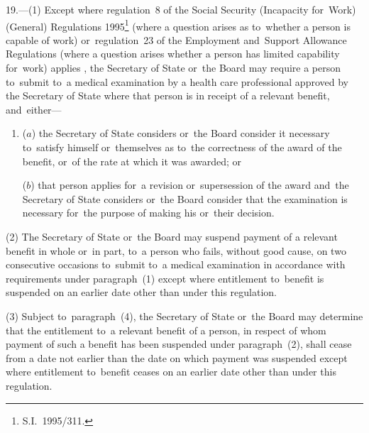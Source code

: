 \documentclass[12pt,a4paper]{article}
\begin{document}
19.—(1) Except where regulation~8 of the Social Security (Incapacity for~Work) (General) Regulations 1995\footnote{\frenchspacing S.I.~1995/311.} 
(where a question arises as to~whether a person is capable of work)
or~regulation~23 of the Employment and~Support Allowance Regulations (where a question arises whether a person has limited capability for~work) applies%
, the Secretary of State 
or~the Board  %
may require a person to~submit to~a medical examination by a 
health care professional approved by the Secretary of State  %
where that person is in receipt of a relevant benefit, and~either—
\begin{enumerate}\item[]
($a$) the Secretary of State considers 
or~the Board consider  %
it necessary to~satisfy himself 
or~themselves  %
as to~the correctness of the award of the benefit, or~of the rate at which it was awarded; or

($b$) that person applies for~a revision or~supersession of the award and~the Secretary of State considers 
or~the Board consider  %
that the examination is necessary for~the purpose of making his 
or~their  %
decision.
\end{enumerate}

(2) The Secretary of State 
or~the Board  %
may suspend payment of a relevant benefit in whole or~in part, to~a person who fails, without good cause, on two consecutive occasions to~submit to~a medical examination in accordance with requirements under paragraph~(1) except where entitlement to~benefit is suspended on an earlier date other than under this regulation.

(3) Subject to~paragraph~(4), the Secretary of State 
or~the Board  %
may determine that the entitlement to~a relevant benefit of a person, in respect of whom payment of such a benefit has been suspended under paragraph~(2), shall cease from a date not earlier than the date on which payment was suspended except where entitlement to~benefit ceases on an earlier date other than under this regulation.
\end{document}
